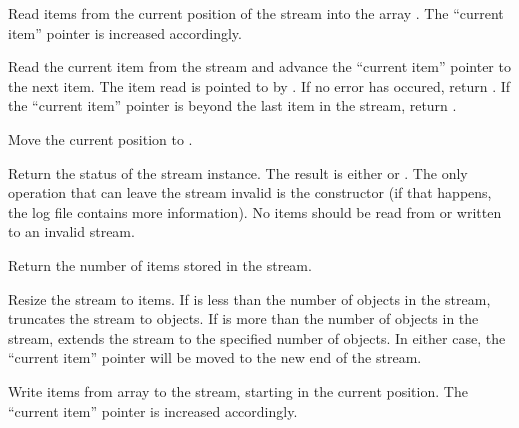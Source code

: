      {Read  items from
the current position of the stream into the array . The
``current item'' pointer is increased accordingly. }

     {Read the current item from the stream and
    advance the ``current item'' pointer to the next item. The item read is
    pointed to by . If no error has occured, return
. If the ``current item'' pointer is beyond
the last item in the stream, return .}
    
     {Move the current position to .}

     {Return the status
    of the stream instance. The result is either
     or
    . The only operation that can
    leave the stream invalid is the constructor (if that happens, the log
    file contains more information). No items should be read from or
    written to an invalid stream.}

     {Return the number of items stored in
the stream.}

     {Resize the stream to
 items. If  is less than the number of objects in the
stream,  truncates the stream to
 objects. If  is more than the
number of objects in the stream,  extends
the stream to the specified number of objects. In either
case, the ``current item'' pointer will be moved to the new end of
the stream.}

     {Write
 items from array  to the stream, starting in the
current position. The ``current item'' pointer is increased accordingly.}

